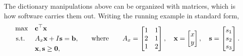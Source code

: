 The dictionary manipulations above can be organized with matrices, which is how software carries them out. Writing the running example in standard form,
\[
\begin{aligned}
\max \quad & \mathbf{c}^\top \mathbf{x} \\
\text{ s.t. } \quad & A_x\mathbf{x} + I\mathbf{s}  = \mathbf{b}, \\
& \mathbf{x}, \mathbf{s} \geq \mathbf{0},
\end{aligned}
\qquad\text{where}\qquad
A_x =
\begin{bmatrix}
1 & 1 \\
2 & 1 \\
1 & 2
\end{bmatrix},
\quad
\mathbf{x} =
\begin{bmatrix}
x \\
y \\
\end{bmatrix},
\quad
\mathbf{s} =
\begin{bmatrix}
s_1 \\
s_2 \\
s_3
\end{bmatrix}.
\]


